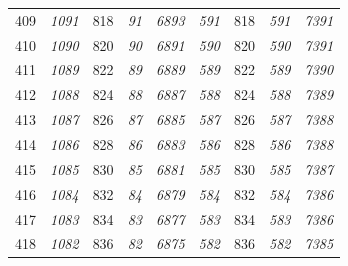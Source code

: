 \documentclass[10pt,fleqn]{article}
\begin{document}
\begin{longtable}{c|cccccccc}
409 & {\color{blue} \it 1091 \rm} & {\color{black} 818} & {\color{blue} \it 91 \rm} & {\color{blue} \it 6893 \rm} & {\color{blue} \it 591 \rm} & {\color{black} 818} & {\color{blue} \it 591 \rm} & {\color{blue} \it 7391 \rm} \\
410 & {\color{blue} \it 1090 \rm} & {\color{black} 820} & {\color{blue} \it 90 \rm} & {\color{blue} \it 6891 \rm} & {\color{blue} \it 590 \rm} & {\color{black} 820} & {\color{blue} \it 590 \rm} & {\color{blue} \it 7391 \rm} \\
411 & {\color{blue} \it 1089 \rm} & {\color{black} 822} & {\color{blue} \it 89 \rm} & {\color{blue} \it 6889 \rm} & {\color{blue} \it 589 \rm} & {\color{black} 822} & {\color{blue} \it 589 \rm} & {\color{blue} \it 7390 \rm} \\
412 & {\color{blue} \it 1088 \rm} & {\color{black} 824} & {\color{blue} \it 88 \rm} & {\color{blue} \it 6887 \rm} & {\color{blue} \it 588 \rm} & {\color{black} 824} & {\color{blue} \it 588 \rm} & {\color{blue} \it 7389 \rm} \\
413 & {\color{blue} \it 1087 \rm} & {\color{black} 826} & {\color{blue} \it 87 \rm} & {\color{blue} \it 6885 \rm} & {\color{blue} \it 587 \rm} & {\color{black} 826} & {\color{blue} \it 587 \rm} & {\color{blue} \it 7388 \rm} \\
414 & {\color{blue} \it 1086 \rm} & {\color{black} 828} & {\color{blue} \it 86 \rm} & {\color{blue} \it 6883 \rm} & {\color{blue} \it 586 \rm} & {\color{black} 828} & {\color{blue} \it 586 \rm} & {\color{blue} \it 7388 \rm} \\
415 & {\color{blue} \it 1085 \rm} & {\color{black} 830} & {\color{blue} \it 85 \rm} & {\color{blue} \it 6881 \rm} & {\color{blue} \it 585 \rm} & {\color{black} 830} & {\color{blue} \it 585 \rm} & {\color{blue} \it 7387 \rm} \\
416 & {\color{blue} \it 1084 \rm} & {\color{black} 832} & {\color{blue} \it 84 \rm} & {\color{blue} \it 6879 \rm} & {\color{blue} \it 584 \rm} & {\color{black} 832} & {\color{blue} \it 584 \rm} & {\color{blue} \it 7386 \rm} \\
417 & {\color{blue} \it 1083 \rm} & {\color{black} 834} & {\color{blue} \it 83 \rm} & {\color{blue} \it 6877 \rm} & {\color{blue} \it 583 \rm} & {\color{black} 834} & {\color{blue} \it 583 \rm} & {\color{blue} \it 7386 \rm} \\
418 & {\color{blue} \it 1082 \rm} & {\color{black} 836} & {\color{blue} \it 82 \rm} & {\color{blue} \it 6875 \rm} & {\color{blue} \it 582 \rm} & {\color{black} 836} & {\color{blue} \it 582 \rm} & {\color{blue} \it 7385 \rm} \\

\end{longtable}
\end{document}
